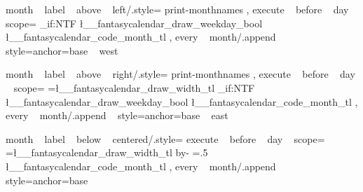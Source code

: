 \tikzset
  {
    month ~ label ~ above ~ left/.style=
      {
        print-monthnames ,
        execute ~ before ~ day ~ scope=
          {
              {
                {
                  \bool_if:NTF \l__fantasycalendar_draw_weekday_bool
                    {  }
                    {  }
                  \l__fantasycalendar_code_month_tl%
                }
              } 
          }
        ,
        every ~ month/.append ~ style={anchor=base ~ west}
      }
  }



\tikzset
  {
    month ~ label ~ above ~ right/.style=
      {
        print-monthnames ,
        execute ~ before ~ day ~ scope=
          {
              {
                {
                  \pgf@xb=\l__fantasycalendar_draw_width_tl\pgf@xa%
                  \pgftransformxshift{\pgf@xb}%
                  \bool_if:NTF \l__fantasycalendar_draw_weekday_bool
                    {  }
                    {  }
                  \l__fantasycalendar_code_month_tl%
                }
              } 
          }
        ,
        every ~ month/.append ~ style={anchor=base ~ east}
      }
  }

\tikzset
  {
    month ~ label ~ below ~ centered/.style=
      {
        execute ~ before ~ day ~ scope=
          {
              {
                {
                  \pgf@xb=\l__fantasycalendar_draw_width_tl\pgf@xa%
                  \advance\pgf@xb by-\pgf@xa%
                  \pgf@xb=.5\pgf@xb%
                  \pgftransformxshift{\pgf@xb}%
                  \pgftransformxshift{-1.5ex}%
                  \l__fantasycalendar_code_month_tl%
                }
              } 
          }
        ,
        every ~ month/.append ~ style={anchor=base}
      }
  }

